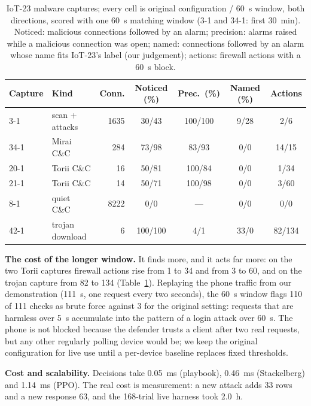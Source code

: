 \documentclass[conference]{IEEEtran}
\begin{document}
\begin{table}[t]
\caption{IoT-23 malware captures; every cell is original configuration / 60~s window, both directions, scored with one 60~s matching window (3-1 and 34-1: first 30~min). Noticed: malicious connections followed by an alarm; precision: alarms raised while a malicious connection was open; named: connections followed by an alarm whose name fits IoT-23's label (our judgement); actions: firewall actions with a 60~s block.}
\label{tab:public}
\centering
\scriptsize
\setlength{\tabcolsep}{2.5pt}
\begin{tabular}{@{}llrcccc@{}}
\toprule
Capture & Kind & Conn. & Noticed (\%) & Prec.\ (\%) & Named (\%) & Actions \\
\midrule
3-1 & scan + attacks & 1635 & 30/43 & 100/100 & 9/28 & 2/6 \\
34-1 & Mirai C\&C & 284 & 73/98 & 83/93 & 0/0 & 14/15 \\
20-1 & Torii C\&C & 16 & 50/81 & 100/84 & 0/0 & 1/34 \\
21-1 & Torii C\&C & 14 & 50/71 & 100/98 & 0/0 & 3/60 \\
8-1 & quiet C\&C & 8222 & 0/0 & --- & 0/0 & 0/0 \\
42-1 & trojan download & 6 & 100/100 & 4/1 & 33/0 & 82/134 \\
\bottomrule
\end{tabular}
\end{table}

\textbf{The cost of the longer window.} It finds more, and it acts far more: on the two Torii captures firewall actions rise from 1 to 34 and from 3 to 60, and on the trojan capture from 82 to 134 (Table~\ref{tab:public}). Replaying the phone traffic from our demonstration (111~s, one request every two seconds), the 60~s window flags 110 of 111 checks as brute force against 3 for the original setting: requests that are harmless over 5~s accumulate into the pattern of a login attack over 60~s. The phone is not blocked because the defender trusts a client after two real requests, but any other regularly polling device would be; we keep the original configuration for live use until a per-device baseline replaces fixed thresholds.

\textbf{Cost and scalability.} Decisions take 0.05~ms (playbook), 0.46~ms (Stackelberg) and 1.14~ms (PPO). The real cost is measurement: a new attack adds 33 rows and a new response 63, and the 168-trial live harness took 2.0~h.

\end{document}
